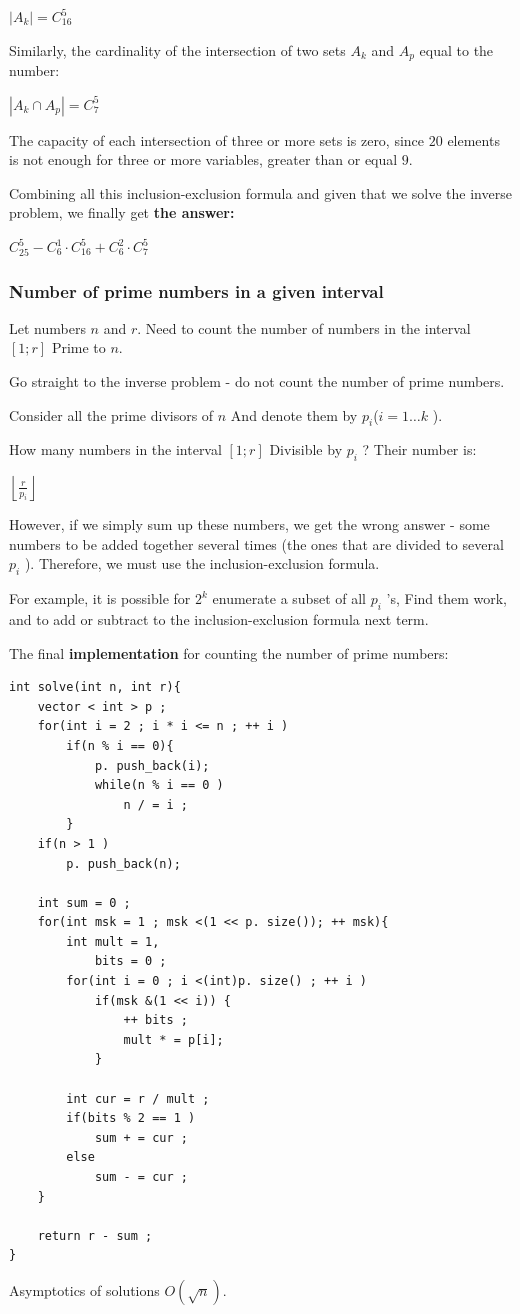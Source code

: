 $| A_k | = C_ {16} ^ 5$

Similarly, the cardinality of the intersection of two sets $A_k$ and $A_p$ equal to the number:

$\left | A_k \cap A_p \right | = C_7 ^ 5$

The capacity of each intersection of three or more sets is zero, since $20$ elements is not enough for three or more variables, greater than or equal $9$.

Combining all this inclusion-exclusion formula and given that we solve the inverse problem, we finally get \textbf{the answer:}

$C_{25}^{5}-C_{6}^{1}\cdot C_{16}^{5}+C_{6}^{2}\cdot C_{7}^{5}$

\subsubsection{ Number of prime numbers in a given interval }

Let numbers $n$ and $r$. Need to count the number of numbers in the interval $[1; r]$ Prime to $n$.

Go straight to the inverse problem - do not count the number of prime numbers.

Consider all the prime divisors of $n$ And denote them by $p_i$($i = 1 \ldots k$ ).

How many numbers in the interval $[1; r]$ Divisible by $p_i$ ? Their number is:

$\left \lfloor \frac {r} {p_i} \right \rfloor$

However, if we simply sum up these numbers, we get the wrong answer - some numbers to be added together several times (the ones that are divided to several $p_i$ ). Therefore, we must use the inclusion-exclusion formula.

For example, it is possible for $2 ^ k$ enumerate a subset of all $p_i$ 's, Find them work, and to add or subtract to the inclusion-exclusion formula next term.

The final \textbf{implementation} for counting the number of prime numbers:

\begin{verbatim}
int solve(int n, int r){
    vector < int > p ;
    for(int i = 2 ; i * i <= n ; ++ i )
        if(n % i == 0){
            p. push_back(i);
            while(n % i == 0 )
                n / = i ;
        }
    if(n > 1 )
        p. push_back(n);
 
    int sum = 0 ;
    for(int msk = 1 ; msk <(1 << p. size()); ++ msk){
        int mult = 1,
            bits = 0 ;
        for(int i = 0 ; i <(int)p. size() ; ++ i )
            if(msk &(1 << i)) {
                ++ bits ;
                mult * = p[i];
            }
 
        int cur = r / mult ;
        if(bits % 2 == 1 )
            sum + = cur ;
        else
            sum - = cur ;
    }
 
    return r - sum ;
} 
\end{verbatim}
Asymptotics of solutions $O (\sqrt {n})$.

